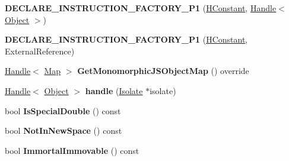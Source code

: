 \begin{DoxyCompactItemize}
\item 
{\bfseries D\+E\+C\+L\+A\+R\+E\+\_\+\+I\+N\+S\+T\+R\+U\+C\+T\+I\+O\+N\+\_\+\+F\+A\+C\+T\+O\+R\+Y\+\_\+\+P1} (\hyperlink{classv8_1_1internal_1_1_h_constant}{H\+Constant}, \hyperlink{classv8_1_1internal_1_1_handle}{Handle}$<$ \hyperlink{classv8_1_1internal_1_1_object}{Object} $>$)\hypertarget{classv8_1_1internal_1_1_h_constant_aa4c319a39ec2af29905297299acfea97}{}\label{classv8_1_1internal_1_1_h_constant_aa4c319a39ec2af29905297299acfea97}

\item 
{\bfseries D\+E\+C\+L\+A\+R\+E\+\_\+\+I\+N\+S\+T\+R\+U\+C\+T\+I\+O\+N\+\_\+\+F\+A\+C\+T\+O\+R\+Y\+\_\+\+P1} (\hyperlink{classv8_1_1internal_1_1_h_constant}{H\+Constant}, External\+Reference)\hypertarget{classv8_1_1internal_1_1_h_constant_affecc65f7654c760dbd54e3bffe5e951}{}\label{classv8_1_1internal_1_1_h_constant_affecc65f7654c760dbd54e3bffe5e951}

\item 
\hyperlink{classv8_1_1internal_1_1_handle}{Handle}$<$ \hyperlink{classv8_1_1internal_1_1_map}{Map} $>$ {\bfseries Get\+Monomorphic\+J\+S\+Object\+Map} () override\hypertarget{classv8_1_1internal_1_1_h_constant_a3839bded8ebf75265006e8910dc37625}{}\label{classv8_1_1internal_1_1_h_constant_a3839bded8ebf75265006e8910dc37625}

\item 
\hyperlink{classv8_1_1internal_1_1_handle}{Handle}$<$ \hyperlink{classv8_1_1internal_1_1_object}{Object} $>$ {\bfseries handle} (\hyperlink{classv8_1_1internal_1_1_isolate}{Isolate} $\ast$isolate)\hypertarget{classv8_1_1internal_1_1_h_constant_a9eb37de804f3736f31f7df7d650b9306}{}\label{classv8_1_1internal_1_1_h_constant_a9eb37de804f3736f31f7df7d650b9306}

\item 
bool {\bfseries Is\+Special\+Double} () const \hypertarget{classv8_1_1internal_1_1_h_constant_a31e7ec7b08b00640174ede01f8104daf}{}\label{classv8_1_1internal_1_1_h_constant_a31e7ec7b08b00640174ede01f8104daf}

\item 
bool {\bfseries Not\+In\+New\+Space} () const \hypertarget{classv8_1_1internal_1_1_h_constant_a7c0b2eb301e288da86210aeb107dc4e4}{}\label{classv8_1_1internal_1_1_h_constant_a7c0b2eb301e288da86210aeb107dc4e4}

\item 
bool {\bfseries Immortal\+Immovable} () const \hypertarget{classv8_1_1internal_1_1_h_constant_a51d1fe2bfaa65e4a07e031544e09eb5c}{}\label{classv8_1_1internal_1_1_h_constant_a51d1fe2bfaa65e4a07e031544e09eb5c}


\end{DoxyCompactItemize}
